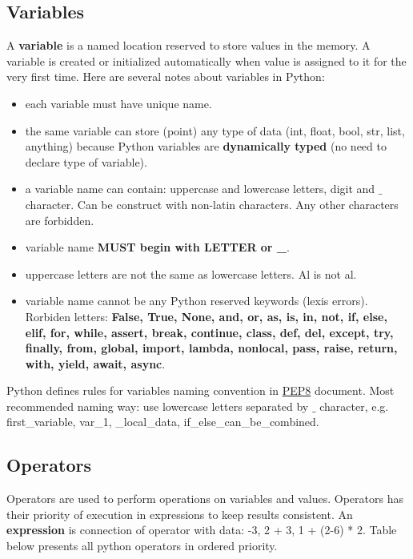 \documentclass{article}
\begin{document}
	\newpage
	\subsection{Variables}
	A \textbf{variable} is a named location reserved to store values in the memory. A variable is created or initialized automatically when value is assigned to it for the very first time. Here are several notes about variables in Python:
	\begin{itemize}
	\item each variable must have unique name.
	\item the same variable can store (point) any type of data (int, float, bool, str, list, anything) because Python variables are \textbf{dynamically typed} (no need to declare type of variable).
	\item a variable name can contain: uppercase and lowercase letters, digit and $\_$ character. Can be construct with non-latin characters. Any other characters are forbidden.
	\item variable name \textbf{MUST begin with LETTER or \_}.
	\item uppercase letters are not the same as lowercase letters. Al is not al.
	\item variable name cannot be any Python reserved keywords (lexis errors). Rorbiden letters: \textbf{False, True, None, and, or, as, is, in, not, if, else, elif, for, while, assert, break, continue, class, def, del, except, try, finally, from, global, import, lambda, nonlocal, pass, raise, return, with, yield, await, async}.
	\end{itemize}
	Python defines rules for variables naming convention in \href{https://peps.python.org/pep-0008/}{PEP8} document. Most recommended naming way: use lowercase letters separated by $\_$ character, e.g. first\_variable, var\_1, \_local\_data, if\_else\_can\_be\_combined.
	
		\newpage
	\subsection{Operators}
	Operators are used to perform operations on variables and values. Operators has their priority of execution in expressions to keep results consistent. An \textbf{expression} is connection of operator with data: -3, 2 + 3, 1 + (2-6) * 2.
	Table below presents all python operators in ordered priority.
\end{document}
